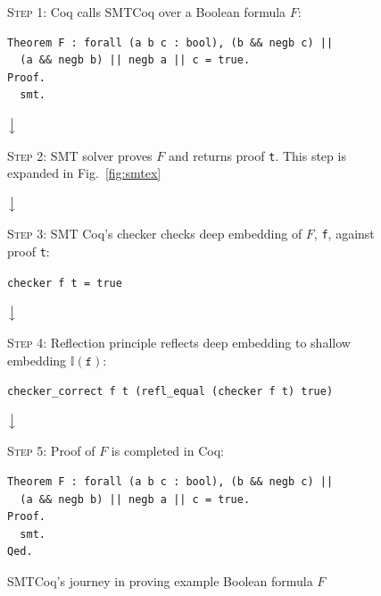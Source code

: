 \documentclass{article}
\begin{document}
	\begin{figure}
		\begin{framed}
			\textsc{Step 1}: Coq calls SMTCoq over 
			a Boolean formula $F$:
			\begin{verbatim}
Theorem F : forall (a b c : bool), (b && negb c) || 
  (a && negb b) || negb a || c = true.
Proof.
  smt.
			\end{verbatim}
		\end{framed}
		
		\begin{center}
			$\big\downarrow$
		\end{center}
		
		\begin{framed}
			\begin{center}
				\textsc{Step 2}: SMT solver 
				proves $F$ and returns proof 
				\texttt{t}. This step is 
				expanded in Fig.~\ref{fig:smtex}
			\end{center}
		\end{framed}
		
		\begin{center}
			$\big\downarrow$
		\end{center}
		
		\begin{framed}
			\textsc{Step 3}: SMT Coq's checker 
			checks deep embedding of $F$, 
			\texttt{f}, against proof 
			\texttt{t}:
			\begin{center}
				\texttt{checker f t = true}
			\end{center}
		\end{framed}
		
		\begin{center}
			$\big\downarrow$
		\end{center}
		
		\begin{framed}
			\textsc{Step 4}: Reflection principle 
			reflects deep embedding to shallow 
			embedding $\mathbb{I}(\texttt{f})$:
			\begin{center}
				\texttt{checker\_correct f t 
					(refl\_equal (checker 
					f t) true)}
			\end{center}
		\end{framed}
		
		\begin{center}
			$\big\downarrow$
		\end{center}
		
		\begin{framed}
			\textsc{Step 5}: Proof of $F$ is 
			completed in Coq:
			\begin{verbatim}
Theorem F : forall (a b c : bool), (b && negb c) || 
  (a && negb b) || negb a || c = true.
Proof.
  smt.
Qed.
			\end{verbatim}
		\end{framed}
		
		\caption{SMTCoq's journey in proving 
			example Boolean formula $F$}
		\label{fig:smtcoqex}
	\end{figure}
	
\end{document}
